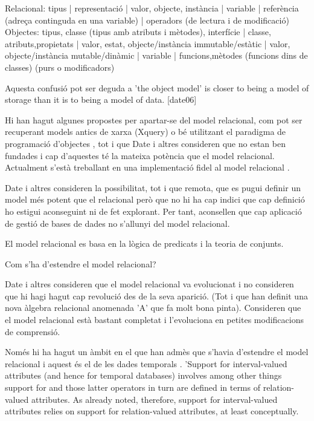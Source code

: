 Relacional: tipus | representació |  valor, objecte, instància  | variable  | referència (adreça continguda en una variable) | operadors (de lectura i de modificació)
Objectes: tipus, classe (tipus amb atributs i mètodes), interfície | classe, atributs,propietats  |  valor, estat, objecte/instància immutable/estàtic |  valor, objecte/instància mutable/dinàmic  | variable | funcions,mètodes (funcions dins de classes) (purs o modificadors)

Aquesta confusió pot ser deguda a 'the object model' is closer to being a model of storage than it is to being a model of data. [date06]


Hi han hagut algunes propostes per apartar-se del model relacional, com pot ser recuperant models antics de xarxa (Xquery) o bé utilitzant el paradigma de programació d'objectes , tot i que Date i altres consideren que no estan ben fundades i cap d'aquestes té la mateixa potència que el model relacional. Actualment s'està treballant en una implementació fidel al model relacional . 

Date i altres consideren la possibilitat, tot i que remota, que es pugui definir un model més potent que el relacional però que no hi ha cap indici que cap definició ho estigui aconseguint ni de fet explorant. Per tant, aconsellen que cap aplicació de gestió de bases de dades no s'allunyi del model relacional.


El model relacional es basa en la lògica de predicats i la teoria de conjunts.





Com s'ha d'estendre el model relacional?

Date i altres consideren que el model relacional va evolucionat i no consideren que hi hagi hagut cap revolució des de la seva aparició. (Tot i que han definit una nova àlgebra relacional anomenada 'A' que fa molt bona pinta). Consideren que el model relacional està bastant completat i l'evoluciona en petites modificacions de comprensió. 

Només hi ha hagut un àmbit en el que han admès que s'havia d'estendre el model relacional i aquest és el de les dades temporals .  'Support for interval-valued attributes (and hence for temporal databases) involves among other things support for
and those latter operators in turn are defined in terms of relation-valued attributes. As already noted, therefore, support
for interval-valued attributes relies on support for relation-valued attributes, at least conceptually. 




